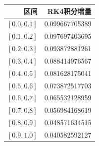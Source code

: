 \begin{center}\small\begin{tabular}{rr}\toprule 区间& RK4积分增量\\\midrule
$[0.0,0.1]$&0.099667705389\\
$[0.1,0.2]$&0.097697403695\\
$[0.2,0.3]$&0.093872881261\\
$[0.3,0.4]$&0.088414976567\\
$[0.4,0.5]$&0.081628175041\\
$[0.5,0.6]$&0.073872517703\\
$[0.6,0.7]$&0.065532128959\\
$[0.7,0.8]$&0.056984168619\\
$[0.8,0.9]$&0.048571634515\\
$[0.9,1.0]$&0.040582592127\\
\bottomrule\end{tabular}\end{center}
